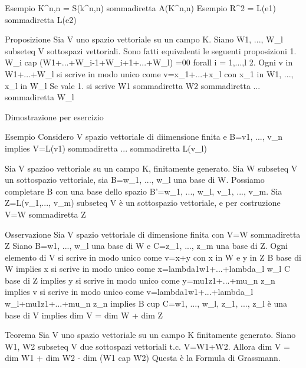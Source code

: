 Esempio K^n,n = S(k^n,n) sommadiretta A(K^n,n)
Esempio R^2 = L(e1) sommadiretta L(e2)

Proposizione
	Sia V uno spazio vettoriale su un campo K. Siano W1, ..., W_l subseteq V sottospazi vettoriali. Sono fatti equivalenti le seguenti proposizioni
	1. W_i cap (W1+...+W_{i-1}+W_{i+1}+...+W_l) ={00} forall i = 1,...,l
	2. Ogni v in W1+...+W_l si scrive in modo unico come v=x_1+...+x_l con x_1 in W1, ..., x_l in W_l
	Se vale 1. si scrive W1 sommadiretta W2 sommadiretta ... sommadiretta W_l
	
Dimostrazione per esercizio %

Esempio
	Considero V spazio vettoriale di diimensione finita e B={v1, ..., v_n} implies V=L(v1) sommadiretta ... sommadiretta L(v_l) %
	
Sia V spazioo vettoriale su un campo K, finitamente generato. Sia W subseteq V un sottospazio vettoriale, sia B={w_1, ..., w_l} una base di W. Possiamo completare B con una base dello spazio B'={w_1, ..., w_l, v_1, ..., v_m}. Sia Z=L(v_1,..., v_m) subseteq V è un sottospazio vettoriale, e per costruzione V=W sommadiretta Z

Osservazione
	Sia V spazio vettoriale di dimensione finita con V=W sommadiretta Z
	Siano B={w1, ..., w_l} una base di W e C={z_1, ..., z_m} una base di Z.
	Ogni elemento di V si scrive in modo unico come v=x+y con x in W e y in Z
	B base di W implies x si scrive in modo unico come x=lambda1w1+...+lambda_l w_l
	C base di Z implies y si scrive in modo unico come y=mu1z1+...+mu_n z_n
	implies v si scrive in modo unico come v=lambda1w1+...+lambda_l w_l+mu1z1+...+mu_n z_n
	implies B cup C={w1, ..., w_l, z_1, ..., z_l} è una base di V implies dim V = dim W + dim Z
	
Teorema
	Sia V uno spazio vettoriale su un campo K finitamente generato. Siano W1, W2 subseteq V due sottospazi vettoriali t.c. V=W1+W2. Allora 
	dim V = dim W1 + dim W2 - dim (W1 cap W2)
	Questa è la Formula di Grassmann.
	

